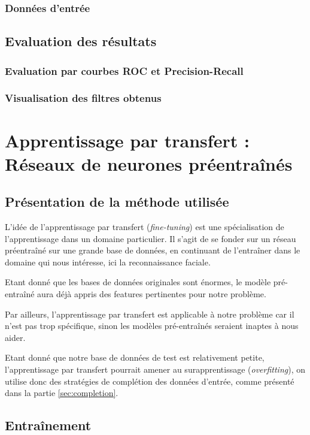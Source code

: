 \documentclass[a4paper,11pt]{article}
\begin{document}
    \subsubsection{Données d'entrée}


\subsection{Evaluation des résultats}
\subsubsection{Evaluation par courbes ROC et Precision-Recall}
\subsubsection{Visualisation des filtres obtenus}

\section{Apprentissage par transfert : Réseaux de neurones préentraînés}
\subsection{Présentation de la méthode utilisée}

L'idée de l'apprentissage par transfert (\textit{fine-tuning}) est une spécialisation de l'apprentissage dans un domaine particulier. Il s'agit de se fonder sur un réseau préentraîné sur une grande base de données, en continuant de l'entraîner dans le domaine qui nous intéresse, ici la reconnaissance faciale.

Etant donné que les bases de données originales sont énormes, le modèle pré-entraîné aura déjà appris des features pertinentes pour notre problème.

Par ailleurs, l'apprentissage par transfert est applicable à notre problème car il n'est pas trop spécifique, sinon les modèles pré-entraînés seraient inaptes à nous aider.

Etant donné que notre base de données de test est relativement petite, l'apprentissage par transfert pourrait amener au surapprentissage (\textit{overfitting}), on utilise donc des stratégies de complétion des données d'entrée, comme présenté dans la partie \ref{sec:completion}.

\subsection{Entraînement}
\end{document}
